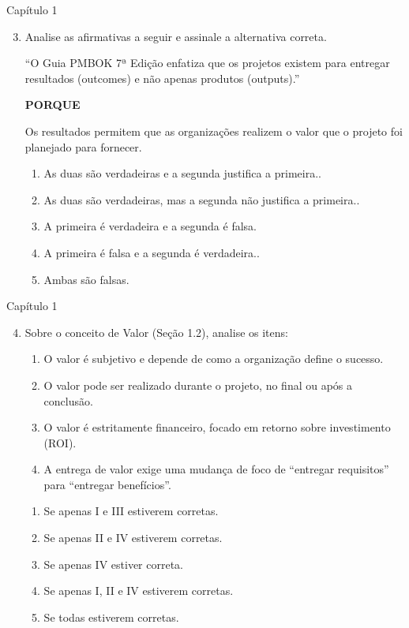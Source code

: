 \documentclass{beamer}
\begin{document}
\begin{frame}{Capítulo 1}
	\begin{enumerate}
		\setcounter{enumi}{2}
		\justifying
		\item Analise as afirmativas a seguir e assinale a alternativa correta.
		
		\vspace{10pt}
		``O Guia PMBOK 7ª Edição enfatiza que os projetos existem para entregar resultados (outcomes) e não apenas produtos (outputs).''
		
		\vspace{10pt}
		\centering \textbf{PORQUE}
		
		\vspace{10pt}
		\justifying
		Os resultados permitem que as organizações realizem o valor que o projeto foi planejado para fornecer.
		
		\vspace{10pt}
		\begin{enumerate}[a]
			\item \alert<2>{As duas são verdadeiras e a segunda justifica a primeira.}.
			\item As duas são verdadeiras, mas a segunda não justifica a primeira..
			\item A primeira é verdadeira e a segunda é falsa.
			\item A primeira é falsa e a segunda é verdadeira..
			\item Ambas são falsas.
		\end{enumerate}
	\end{enumerate}
\end{frame}

\begin{frame}{Capítulo 1}
	\begin{enumerate}
		\setcounter{enumi}{3}
		\justifying
		\item Sobre o conceito de Valor (Seção 1.2), analise os itens:
			\begin{enumerate}[I]
				\justifying
				\item O valor é subjetivo e depende de como a organização define o sucesso.
				\item O valor pode ser realizado durante o projeto, no final ou após a conclusão.
				\item O valor é estritamente financeiro, focado em retorno sobre investimento (ROI).
				\item A entrega de valor exige uma mudança de foco de ``entregar requisitos'' para ``entregar benefícios''.
			\end{enumerate}
		\begin{enumerate}[a]
			\item Se apenas I e III estiverem corretas.
			\item Se apenas II e IV estiverem corretas.
			\item Se apenas IV estiver correta.
			\item \alert<2>{Se apenas I, II e IV estiverem corretas}.
			\item Se todas estiverem corretas.
		\end{enumerate}
	\end{enumerate}
\end{frame}
\end{document}
